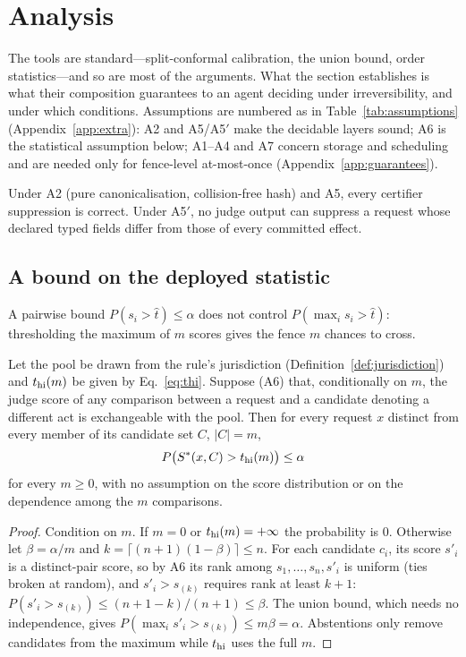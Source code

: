 \section{Analysis}\label{sec:theory}

The tools are standard---split-conformal calibration, the union bound, order statistics---and so are most of the arguments. What the section establishes is what their composition guarantees to an agent deciding under irreversibility, and under which conditions. Assumptions are numbered as in Table~\ref{tab:assumptions} (Appendix~\ref{app:extra}): A2 and A5/A5$'$ make the decidable layers sound; A6 is the statistical assumption below; A1--A4 and A7 concern storage and scheduling and are needed only for fence-level at-most-once (Appendix~\ref{app:guarantees}).

\begin{proposition}\label{prop:sound}
Under A2 (pure canonicalisation, collision-free hash) and A5, every certifier suppression is correct. Under A5$'$, no judge output can suppress a request whose declared typed fields differ from those of every committed effect.
\end{proposition}

\subsection{A bound on the deployed statistic}\label{sec:bound}

A pairwise bound $P(s_i>\hat t)\le\alpha$ does not control $P(\max_i s_i>\hat t)$: thresholding the maximum of $m$ scores gives the fence $m$ chances to cross.

\begin{theorem}\label{thm:bound}
Let the pool be drawn from the rule's jurisdiction (Definition~\ref{def:jurisdiction}) and $t_{\mathrm{hi}}(m)$ be given by Eq.~\eqref{eq:thi}. Suppose (A6) that, conditionally on $m$, the judge score of any comparison between a request and a candidate denoting a different act is exchangeable with the pool. Then for every request $x$ distinct from every member of its candidate set $C$, $|C|=m$,
\[ P\big(S^\ast(x,C)>t_{\mathrm{hi}}(m)\big)\le\alpha \]
for every $m\ge0$, with no assumption on the score distribution or on the dependence among the $m$ comparisons.
\end{theorem}

\begin{proof}
Condition on $m$. If $m=0$ or $t_{\mathrm{hi}}(m)=+\infty$ the probability is 0. Otherwise let $\beta=\alpha/m$ and $k=\lceil(n+1)(1-\beta)\rceil\le n$. For each candidate $c_i$, its score $s'_i$ is a distinct-pair score, so by A6 its rank among $s_1,\dots,s_n,s'_i$ is uniform (ties broken at random), and $s'_i>s_{(k)}$ requires rank at least $k+1$: $P(s'_i>s_{(k)})\le(n+1-k)/(n+1)\le\beta$. The union bound, which needs no independence, gives $P(\max_is'_i>s_{(k)})\le m\beta=\alpha$. Abstentions only remove candidates from the maximum while $t_{\mathrm{hi}}$ uses the full $m$.
\end{proof}

